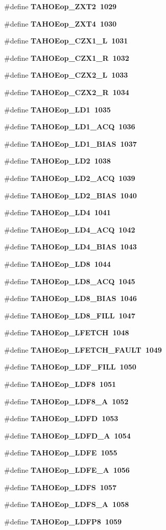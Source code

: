 \begin{CompactItemize}
\#define \bf{TAHOEop\_\-ZXT2}~1029
\item 
\#define \bf{TAHOEop\_\-ZXT4}~1030
\item 
\#define \bf{TAHOEop\_\-CZX1\_\-L}~1031
\item 
\#define \bf{TAHOEop\_\-CZX1\_\-R}~1032
\item 
\#define \bf{TAHOEop\_\-CZX2\_\-L}~1033
\item 
\#define \bf{TAHOEop\_\-CZX2\_\-R}~1034
\item 
\#define \bf{TAHOEop\_\-LD1}~1035
\item 
\#define \bf{TAHOEop\_\-LD1\_\-ACQ}~1036
\item 
\#define \bf{TAHOEop\_\-LD1\_\-BIAS}~1037
\item 
\#define \bf{TAHOEop\_\-LD2}~1038
\item 
\#define \bf{TAHOEop\_\-LD2\_\-ACQ}~1039
\item 
\#define \bf{TAHOEop\_\-LD2\_\-BIAS}~1040
\item 
\#define \bf{TAHOEop\_\-LD4}~1041
\item 
\#define \bf{TAHOEop\_\-LD4\_\-ACQ}~1042
\item 
\#define \bf{TAHOEop\_\-LD4\_\-BIAS}~1043
\item 
\#define \bf{TAHOEop\_\-LD8}~1044
\item 
\#define \bf{TAHOEop\_\-LD8\_\-ACQ}~1045
\item 
\#define \bf{TAHOEop\_\-LD8\_\-BIAS}~1046
\item 
\#define \bf{TAHOEop\_\-LD8\_\-FILL}~1047
\item 
\#define \bf{TAHOEop\_\-LFETCH}~1048
\item 
\#define \bf{TAHOEop\_\-LFETCH\_\-FAULT}~1049
\item 
\#define \bf{TAHOEop\_\-LDF\_\-FILL}~1050
\item 
\#define \bf{TAHOEop\_\-LDF8}~1051
\item 
\#define \bf{TAHOEop\_\-LDF8\_\-A}~1052
\item 
\#define \bf{TAHOEop\_\-LDFD}~1053
\item 
\#define \bf{TAHOEop\_\-LDFD\_\-A}~1054
\item 
\#define \bf{TAHOEop\_\-LDFE}~1055
\item 
\#define \bf{TAHOEop\_\-LDFE\_\-A}~1056
\item 
\#define \bf{TAHOEop\_\-LDFS}~1057
\item 
\#define \bf{TAHOEop\_\-LDFS\_\-A}~1058
\item 
\#define \bf{TAHOEop\_\-LDFP8}~1059

\end{CompactItemize}
